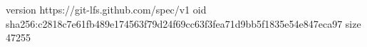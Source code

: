version https://git-lfs.github.com/spec/v1
oid sha256:c2818c7e61fb489e174563f79d24f69cc63f3fea71d9bb5f1835e54e847eca97
size 47255
